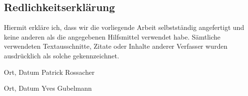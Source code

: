 \newpage
\begin{sffamily}
\section*{Redlichkeitserklärung}

Hiermit erkläre ich, dass wir die vorliegende Arbeit selbstständig angefertigt und keine anderen als die angegebenen Hilfsmittel verwendet habe. Sämtliche verwendeten Textausschnitte, Zitate oder Inhalte anderer Verfasser wurden ausdrücklich als solche gekennzeichnet. 
\vspace{2cm}

\textemdash\textemdash\textemdash\textemdash\textemdash\textemdash
\textemdash\textemdash\textemdash\textemdash\textemdash\textemdash
\hspace{2.2cm}
\textemdash\textemdash\textemdash\textemdash\textemdash\textemdash
\textemdash\textemdash\textemdash\textemdash\textemdash\textemdash
\textemdash\textemdash\textemdash\textemdash\textemdash\textemdash
\newline
Ort, Datum 
\hspace{5cm} 
Patrick Rossacher

\vspace{2cm}

\textemdash\textemdash\textemdash\textemdash\textemdash\textemdash
\textemdash\textemdash\textemdash\textemdash\textemdash\textemdash
\hspace{2.2cm}
\textemdash\textemdash\textemdash\textemdash\textemdash\textemdash
\textemdash\textemdash\textemdash\textemdash\textemdash\textemdash
\textemdash\textemdash\textemdash\textemdash\textemdash\textemdash
\newline
Ort, Datum 
\hspace{5cm} 
Yves Gubelmann


\end{sffamily}
